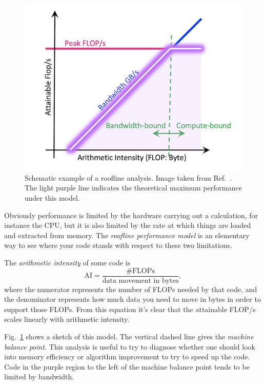 \begin{figure}[t]
  \centering
  \includegraphics[width=\linewidth]{figs/Roofline-intro.png}
  \caption{Schematic example of a roofline analysis.
           Image taken from Ref.~\cite{roofline}.
           The light purple line indicates the theoretical
           maximum performance under this model.}
  \label{fig:roofline}
\end{figure}

Obviously performance is limited by the hardware carrying out a calculation, for
instance the CPU, but it is also limited by the rate at which things are loaded
and extracted from memory. The {\it roofline performance model} is an elementary
way to see where your code stands with respect to these two limitations.

The {\it arithmetic intensity} of some code is
\begin{equation}
  \text{AI}=\frac{\text{\# FLOPs}}{\text{data movement in bytes}},
\end{equation}
where the numerator represents the number of FLOPs needed by that code, and the
denominator represents how much data you need to move in bytes in order to
support those FLOPs. From this equation it's clear that the attainable
FLOP/s scales linearly with arithmetic intensity.

Fig.~\ref{fig:roofline} shows a sketch of this model. The vertical
dashed line gives the {\it machine balance point}.
This analysis is useful to try to diagnose whether one should look into
memory efficiency or algorithm improvement to try to speed up the code.
Code in the purple region to the left of the machine balance point
tends to be limited by bandwidth.

